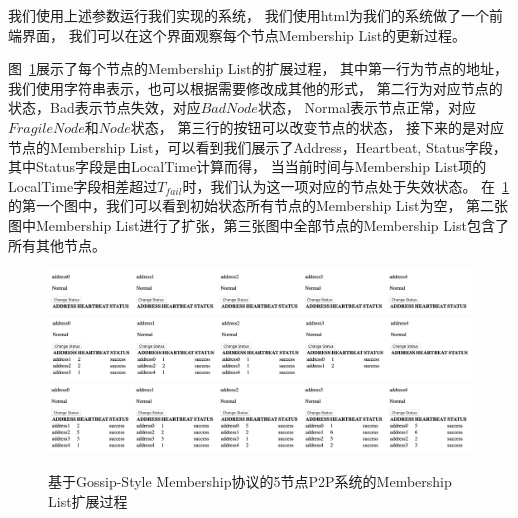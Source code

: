  我们使用上述参数运行我们实现的系统，
 我们使用html为我们的系统做了一个前端界面，
 我们可以在这个界面观察每个节点Membership List的更新过程。

 图~\ref{fig:demo_1}展示了每个节点的Membership List的扩展过程，
 其中第一行为节点的地址，我们使用字符串表示，也可以根据需要修改成其他的形式，
 第二行为对应节点的状态，Bad表示节点失效，对应$BadNode$状态，
 Normal表示节点正常，对应$FragileNode$和$Node$状态，
 第三行的按钮可以改变节点的状态，
 接下来的是对应节点的Membership List，可以看到我们展示了Address，Heartbeat, Status字段，
 其中Status字段是由LocalTime计算而得，
 当当前时间与Membership List项的LocalTime字段相差超过$T_{fail}$时，我们认为这一项对应的节点处于失效状态。
 在~\ref{fig:demo_1}的第一个图中，我们可以看到初始状态所有节点的Membership List为空，
 第二张图中Membership List进行了扩张，第三张图中全部节点的Membership List包含了所有其他节点。
 \begin{figure}[!htp]
   \begin{minipage}{0.9\textwidth}
     \centering
     \includegraphics[width=15cm]{../figure/demo/4.png}
     \\
     \includegraphics[width=15cm]{../figure/demo/5.png}
     \\
     \includegraphics[width=15cm]{../figure/demo/6.png}
   \end{minipage}
   \caption{基于Gossip-Style Membership协议的5节点P2P系统的Membership List扩展过程}
   \label{fig:demo_1}    
\end{figure}

